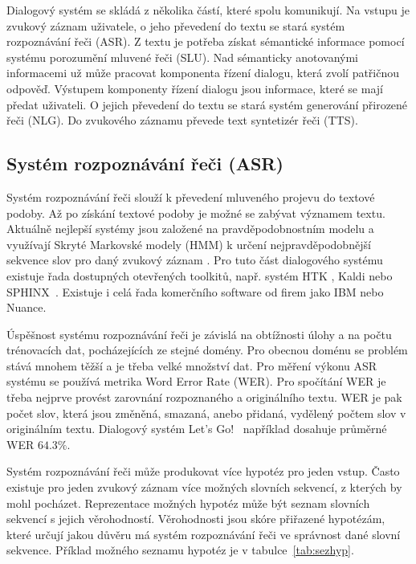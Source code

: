 Dialogový systém se skládá z několika částí, které spolu komunikují.
Na vstupu je zvukový záznam uživatele, o jeho převedení do textu se stará systém rozpoznávání řeči (ASR).
Z textu je potřeba získat sémantické informace pomocí systému porozumění mluvené řeči (SLU).
Nad sémanticky anotovanými informacemi už může pracovat komponenta řízení dialogu, která zvolí patřičnou odpověď.
Výstupem komponenty řízení dialogu jsou informace, které se mají předat uživateli.
O jejich převedení do textu se stará systém generování přirozené řeči (NLG).
Do zvukového záznamu převede text syntetizér řeči (TTS).

\subsection{Systém rozpoznávání řeči (ASR)}

Systém rozpoznávání řeči slouží k převedení mluveného projevu do textové podoby.
Až po získání textové podoby je možné se zabývat významem textu.
Aktuálně nejlepší systémy jsou založené na pravděpodobnostním modelu a využívají Skryté Markovské modely (HMM) k určení nejpravděpodobnější sekvence slov pro daný zvukový záznam \cite{juang1991hidden}.
Pro tuto část dialogového systému existuje řada dostupných otevřených toolkitů, např. systém HTK \cite{young2002htk}, Kaldi \cite{Povey_ASRU2011} nebo SPHINX~\cite{walker2004sphinx}.
Existuje i celá řada komerčního software od firem jako IBM nebo Nuance.

Úspěšnost systému rozpoznávání řeči je závislá na obtížnosti úlohy a na počtu trénovacích dat, pocházejících ze stejné domény.
Pro obecnou doménu se problém stává mnohem těžší a je třeba velké množství dat.
Pro měření výkonu ASR systému se používá metrika Word Error Rate (WER).
Pro spočítání WER je třeba nejprve provést zarovnání rozpoznaného a originálního textu.
WER je pak počet slov, která jsou změněná, smazaná, anebo přidaná, vydělený počtem slov v originálním textu.
Dialogový systém Let's Go!~\cite{raux2006doing} například dosahuje průměrné WER $64.3\%$.

Systém rozpoznávání řeči může produkovat více hypotéz pro jeden vstup.
Často existuje pro jeden zvukový záznam více možných slovních sekvencí, z kterých by mohl pocházet.
Reprezentace možných hypotéz může být seznam slovních sekvencí s jejich věrohodností.
Věrohodnosti jsou skóre přiřazené hypotézám, které určují jakou důvěru má systém rozpoznávání řeči ve správnost dané slovní sekvence.
Příklad možného seznamu hypotéz je v tabulce~\ref{tab:sezhyp}.


